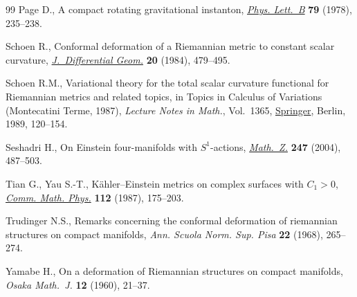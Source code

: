 \begin{thebibliography}{99}
Page D., A compact rotating gravitational instanton, \href{https://doi.org/10.1016/0370-2693(78)90231-9}{\textit{Phys. Lett.~B}}
 \textbf{79} (1978), 235--238.

Schoen R., Conformal deformation of a {R}iemannian metric to constant scalar
 curvature, \href{https://doi.org/10.4310/jdg/1214439291}{\textit{J.~Differential Geom.}} \textbf{20} (1984), 479--495.

Schoen R.M., Variational theory for the total scalar curvature functional for
 {R}iemannian metrics and related topics, in Topics in Calculus of Variations
 ({M}ontecatini {T}erme, 1987), \textit{Lecture Notes in Math.}, Vol.~1365,
 \href{https://doi.org/10.1007/BFb0089180}{Springer}, Berlin, 1989, 120--154.

Seshadri H., On {E}instein four-manifolds with {$S^1$}-actions,
 \href{https://doi.org/10.1007/s00209-003-0557-4}{\textit{Math.~Z.}} \textbf{247} (2004), 487--503.

Tian G., Yau S.-T., K\"ahler--{E}instein metrics on complex surfaces with
 {$C_1>0$}, \href{https://doi.org/10.1007/BF01217685}{\textit{Comm. Math. Phys.}} \textbf{112} (1987), 175--203.

Trudinger N.S., Remarks concerning the conformal deformation of riemannian
 structures on compact manifolds, \textit{Ann. Scuola Norm. Sup. Pisa}
 \textbf{22} (1968), 265--274.

Yamabe H., On a deformation of {R}iemannian structures on compact manifolds,
 \textit{Osaka Math.~J.} \textbf{12} (1960), 21--37.

\end{thebibliography}\LastPageEnding
